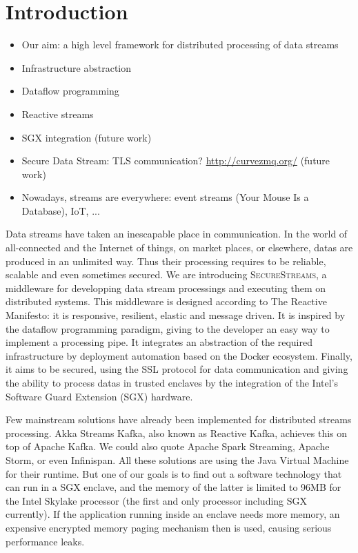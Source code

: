\section{Introduction}
\label{sec:introduction}

\begin{itemize}
  \item Our aim: a high level framework for distributed processing of data streams
  \item Infrastructure abstraction
  \item Dataflow programming
  \item Reactive streams
  \item SGX integration (future work)
  \item Secure Data Stream: TLS communication? \url{http://curvezmq.org/} (future work)
  \item Nowadays, streams are everywhere: event streams (Your Mouse Is a Database), IoT, ...
\end{itemize}

Data streams have taken an inescapable place in communication.
In the world of all-connected and the Internet of things, on market places, or elsewhere, datas are produced in an unlimited way.
Thus their processing requires to be reliable, scalable and even sometimes secured.
We are introducing \textsc{SecureStreams}, a middleware for developping data stream processings and executing them on distributed systems.
This middleware is designed according to The Reactive Manifesto: it is responsive, resilient, elastic and message driven\cite{reactivemanifesto}.
It is inspired by the dataflow programming paradigm, giving to the developer an easy way to implement a processing pipe.
It integrates an abstraction of the required infrastructure by deployment automation based on the Docker ecosystem.
Finally, it aims to be secured, using the SSL protocol for data communication and giving the ability to process datas in trusted enclaves by the integration of the Intel's Software Guard Extension (SGX) hardware.

Few mainstream solutions have already been implemented for distributed streams processing.
Akka Streams Kafka, also known as Reactive Kafka\cite{reactivekafka}, achieves this on top of Apache Kafka\cite{apachekafka}.
We could also quote  Apache Spark Streaming\cite{apachesparkstreaming}, Apache Storm\cite{apachestorm}, or even Infinispan\cite{infinispan}.
All these solutions are using the Java Virtual Machine for their runtime.
But one of our goals is to find out a software technology that can run in a SGX enclave, and the memory of the latter is limited to 96MB for the Intel Skylake processor (the first and only processor including SGX currently)\cite{costan_intel}.
If the application running inside an enclave needs more memory, an expensive encrypted memory paging mechanism then is used, causing serious performance leaks\cite{brenner_securekeeper:_2016}.
